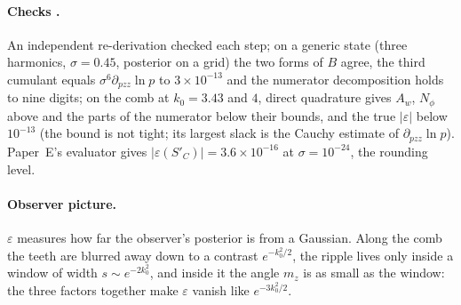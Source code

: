 \paragraph*{Checks \numst.}
An independent re-derivation checked each step; on a generic state (three harmonics, $\sigma=0.45$, posterior on a grid) the two forms of $B$ agree,
the third cumulant equals $\sigma^6\partial_{pzz}\ln p$ to $3\times10^{-13}$ and the numerator decomposition holds to nine digits; on the comb at $k_0=3.43$ and $4$,
direct quadrature gives $A_w$, $N_\phi$ above and the parts of the numerator below their bounds, and the true $|\varepsilon|$ below $10^{-13}$
(the bound is not tight; its largest slack is the Cauchy estimate of $\partial_{pzz}\ln p$). Paper~E's evaluator gives $|\varepsilon(S'_C)|=3.6\times10^{-16}$ at
$\sigma=10^{-24}$, the rounding level.

\paragraph*{Observer picture.}
$\varepsilon$ measures how far the observer's posterior is from a Gaussian. Along the comb the teeth are blurred away down to a contrast
$e^{-k_0^2/2}$, the ripple lives only inside a window of width $s\sim e^{-2k_0^2}$, and inside it the angle $m_z$ is as small as the window:
the three factors together make $\varepsilon$ vanish like $e^{-3k_0^2/2}$.
